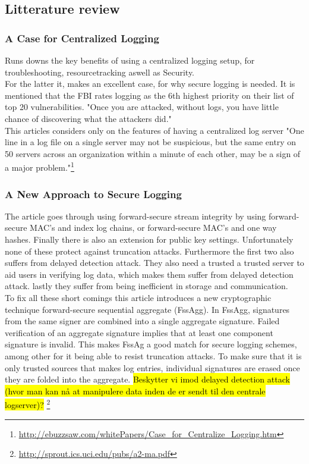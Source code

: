 \subsection{Litterature review}

\subsubsection{A Case for Centralized Logging }

Runs downs the key benefits of using a centralized logging setup, for troubleshooting, resourcetracking aswell as Security. \\
For the latter it, makes an excellent case, for why secure logging is needed. It is mentioned that the FBI rates logging as the 6th highest priority on their list of top 20 vulnerabilities. "Once you are attacked, without logs, you have little chance of discovering what the attackers did."\\
This articles considers only on the features of having a centralized log server "One line in a log file on a single server may not be suspicious, but the same entry on 50 servers across an organization within a minute of each other, may be a sign of a major problem."\footnote{\url{http://ebuzzsaw.com/whitePapers/Case_for_Centralize_Logging.htm}}

\subsubsection{A New Approach to Secure Logging}
The article goes through using forward-secure stream integrity by using forward-secure MAC's and index log chains, or forward-secure MAC's and one way hashes. Finally there is also an extension for public key settings. Unfortunately none of these protect against truncation attacks. Furthermore the first two also suffers from delayed detection attack. They also need a trusted a trusted server to aid users in verifying log data, which makes them suffer from delayed detection attack. lastly they suffer from being inefficient in storage and communication.\\
To fix all these short comings this article introduces a new cryptographic technique  forward-secure sequential aggregate (FssAgg). In FssAgg, signatures from the same signer are combined into a single aggregate signature. Failed verification of an aggregate signature implies that at least one component signature is invalid. This makes FssAg a good match for secure logging schemes, among other for it being able to resist truncation attacks. To make sure that it is only trusted sources that makes log entries, individual signatures are erased once they are folded into the aggregate.
  \hl{Beskytter vi imod delayed detection attack (hvor man kan nå at manipulere data inden de er sendt til den centrale logserver)?}
\footnote{\url{http://sprout.ics.uci.edu/pubs/a2-ma.pdf}}
